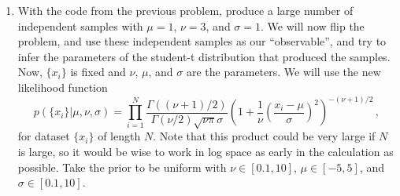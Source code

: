 \documentclass[
    aps,
    10pt,
    prd,
    notitlepage,
    onecolumn,s
    tightenlines,
    nofootinbib]{revtex4-1}
\begin{document}
\begin{enumerate}
\item With the code from the previous problem, produce a large number of independent samples with $\mu=1$, $\nu=3$, and $\sigma=1$.
We will now flip the problem, and use these independent samples as our ``observable'', and try to infer the parameters of the student-t distribution that produced the samples.
Now, $\{x_i\}$ is fixed and $\nu$, $\mu$, and $\sigma$ are the parameters.
We will use the new likelihood function
\begin{equation}
p(\{x_i\}|\mu,\nu,\sigma) = \prod_{i=1}^{N} \frac{ \Gamma( ( \nu + 1) / 2)}{\Gamma(\nu /2) \sqrt{\nu \pi  } \sigma} \left( 1 + \frac{1}{\nu} \left(  \frac{ x_i  -\mu}{\sigma} \right)^2 \right)^{- (\nu+1)/2}\,,
\end{equation}
for dataset $\{x_i\}$ of length $N$.
Note that this product could be very large if $N$ is large, so it would be wise to work in log space as early in the calculation as possible.
Take the prior to be uniform with $\nu \in [0.1,10]$, $\mu \in [-5,5]$, and $\sigma \in [0.1,10]$.


\end{enumerate}
\end{document}
